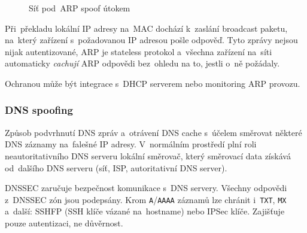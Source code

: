 \begin{figure}[ht]
    \centering
    \caption*{Síť pod~ARP spoof útokem}
\end{figure}

Při~překladu lokální IP adresy na~MAC dochází k~zaslání broadcast paketu, na~který zařízení s~požadovanou IP adresou pošle odpověď. Tyto zprávy nejsou nijak autentizované, ARP je stateless protokol a~všechna zařízení na~síti automaticky \emph{cachují} ARP odpovědi bez~ohledu na to, jestli o~ně požádaly.

Ochranou může být integrace s~DHCP serverem nebo monitoring ARP provozu.

\subsubsection{DNS spoofing}

Způsob podvrhnutí DNS zpráv a~otrávení DNS cache s~účelem směrovat některé DNS záznamy na~falešné IP adresy. V~normálním prostředí plní roli neautoritativního DNS serveru lokální směrovač, který směrovací data získává od~dalšího DNS serveru (síť, ISP, autoritativní DNS server).

DNSSEC zaručuje bezpečnost komunikace s~DNS servery. Všechny odpovědi z~DNSSEC zón jsou podepsány. Krom \texttt{A}/\texttt{AAAA} záznamů lze chránit i~\texttt{TXT}, \texttt{MX} a~další: SSHFP (SSH klíče vázané na~hostname) nebo IPSec klíče. Zajišťuje pouze autentizaci, ne důvěrnost.


